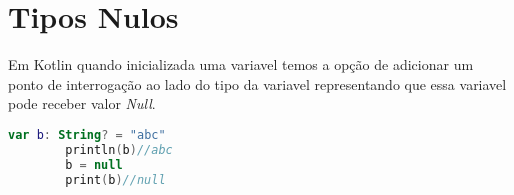 \section{Tipos Nulos}
Em Kotlin quando inicializada uma variavel
    temos a opção de adicionar um ponto de interrogação
    ao lado do tipo da variavel representando que essa variavel pode
    receber valor \emph{Null}.
    
    \begin{lstlisting}[label={lst:example1}, language=Kotlin]
        var b: String? = "abc" 
        println(b)//abc
        b = null
        print(b)//null
    \end{lstlisting}
\newpage